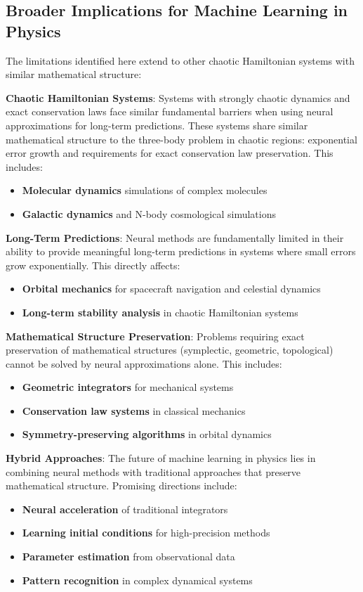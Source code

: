 \documentclass[11pt,a4paper]{article}
\begin{document}
\subsection{Broader Implications for Machine Learning in Physics}

The limitations identified here extend to other chaotic Hamiltonian systems with similar mathematical structure:

\textbf{Chaotic Hamiltonian Systems}: Systems with strongly chaotic dynamics and exact conservation laws face similar fundamental barriers when using neural approximations for long-term predictions. These systems share similar mathematical structure to the three-body problem in chaotic regions: exponential error growth and requirements for exact conservation law preservation. This includes:
\begin{itemize}
    \item \textbf{Molecular dynamics} simulations of complex molecules
    \item \textbf{Galactic dynamics} and N-body cosmological simulations
\end{itemize}



\textbf{Long-Term Predictions}: Neural methods are fundamentally limited in their ability to provide meaningful long-term predictions in systems where small errors grow exponentially. This directly affects:
\begin{itemize}
    \item \textbf{Orbital mechanics} for spacecraft navigation and celestial dynamics
    \item \textbf{Long-term stability analysis} in chaotic Hamiltonian systems
\end{itemize}

\textbf{Mathematical Structure Preservation}: Problems requiring exact preservation of mathematical structures (symplectic, geometric, topological) cannot be solved by neural approximations alone. This includes:
\begin{itemize}
    \item \textbf{Geometric integrators} for mechanical systems
    \item \textbf{Conservation law systems} in classical mechanics
    \item \textbf{Symmetry-preserving algorithms} in orbital dynamics
\end{itemize}

\textbf{Hybrid Approaches}: The future of machine learning in physics lies in combining neural methods with traditional approaches that preserve mathematical structure. Promising directions include:
\begin{itemize}
    \item \textbf{Neural acceleration} of traditional integrators
    \item \textbf{Learning initial conditions} for high-precision methods
    \item \textbf{Parameter estimation} from observational data
    \item \textbf{Pattern recognition} in complex dynamical systems
\end{itemize}
\end{document}
